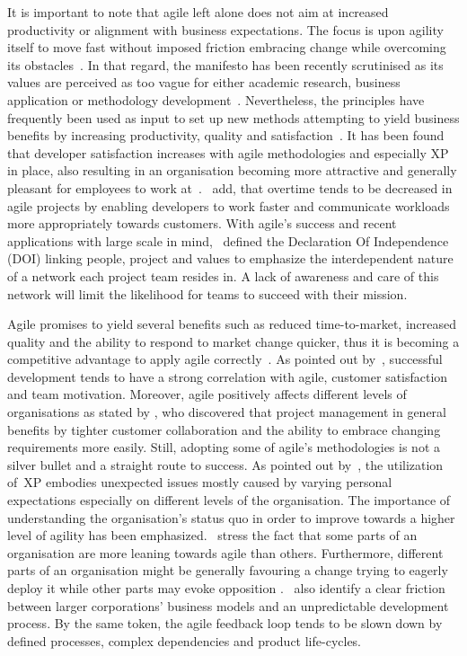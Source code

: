 It is important to note that agile left alone does not aim at increased productivity or alignment with business expectations. The focus is upon agility itself to move fast without imposed friction embracing change while overcoming its obstacles~\citep{larman2008scalingleanagile}. In that regard, the manifesto has been recently scrutinised as its values are perceived as too vague for either academic research, business application or methodology development~\citep{laanti2013definitionsofagile}.
Nevertheless, the principles have frequently been used as input to set up new methods attempting to yield business benefits by increasing productivity, quality and satisfaction~\citep{leffingwell2007scalelargecorps}. It has been found that developer satisfaction increases with agile methodologies and especially \ac{XP} in place, also resulting in an organisation becoming more attractive and generally pleasant for employees to work at~\citep{eckstein2004xp}.~\citet{mann2005casestudyimpactscrum} add, that overtime tends to be decreased in agile projects by enabling developers to work faster and communicate workloads more appropriately towards customers.
With agile's success and recent applications with large scale in mind,~\citet{cockburn2005doi} defined the Declaration Of Independence (DOI) linking people, project and values to emphasize the interdependent nature of a network each project team resides in. A lack of awareness and care of this network will limit the likelihood for teams to succeed with their mission.

Agile promises to yield several benefits such as reduced time-to-market, increased quality and the ability to respond to market change quicker, thus it is becoming a competitive advantage to apply agile correctly~\citep{schwaber2007agile}. 
As pointed out by~\citet{cardozo2010scrumproductivity}, successful development tends to have a strong correlation with agile, customer satisfaction and team motivation. Moreover, agile positively affects different levels of organisations as stated by \citet{ceschi2005projman}, who discovered that project management in general benefits by tighter customer collaboration and the ability to embrace changing requirements more easily.
Still, adopting some of agile's methodologies is not a silver bullet and a straight route to success. As pointed out by~\citet{grenning2001xp}, the utilization of~\ac{XP} embodies unexpected issues mostly caused by varying personal expectations especially on different levels of the organisation. The importance of understanding the organisation's status quo in order to improve towards a higher level of agility has been emphasized.~\citet{kettunen2008agileorg} stress the fact that some parts of an organisation are more leaning towards agile than others. Furthermore, different parts of an organisation might be generally favouring a change trying to eagerly deploy it while other parts may evoke opposition \citep{cohn2003introducingagiletoanorganisation}.~\citet{kettunen2008agileorg} also identify a clear friction between larger corporations' business models and an unpredictable development process. By the same token, the agile feedback loop tends to be slown down by defined processes, complex dependencies and product life-cycles.

